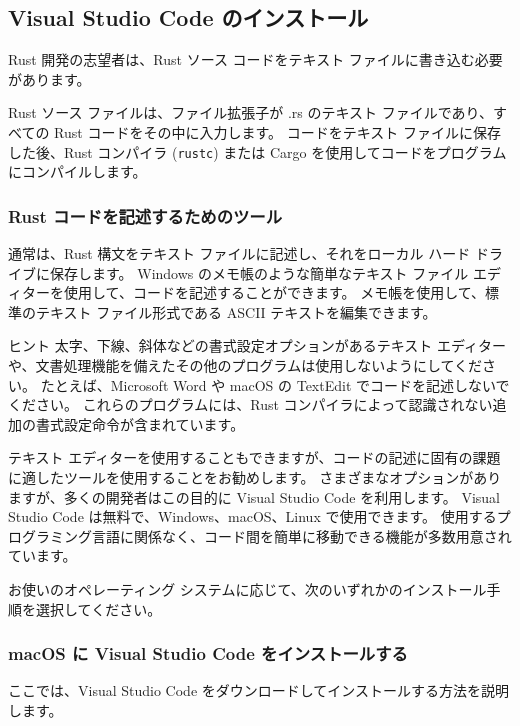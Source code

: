 \subsection{Visual Studio Code のインストール}


Rust 開発の志望者は、Rust ソース コードをテキスト ファイルに書き込む必要があります。

Rust ソース ファイルは、ファイル拡張子が .rs のテキスト ファイルであり、すべての Rust コードをその中に入力します。 コードをテキスト ファイルに保存した後、Rust コンパイラ (\texttt{rustc}) または Cargo を使用してコードをプログラムにコンパイルします。

\subsubsection{Rust コードを記述するためのツール}

通常は、Rust 構文をテキスト ファイルに記述し、それをローカル ハード ドライブに保存します。 Windows のメモ帳のような簡単なテキスト ファイル エディターを使用して、コードを記述することができます。 メモ帳を使用して、標準のテキスト ファイル形式である ASCII テキストを編集できます。

\begin{itembox}[l]{ヒント}
太字、下線、斜体などの書式設定オプションがあるテキスト エディターや、文書処理機能を備えたその他のプログラムは使用しないようにしてください。 たとえば、Microsoft Word や macOS の TextEdit でコードを記述しないでください。 これらのプログラムには、Rust コンパイラによって認識されない追加の書式設定命令が含まれています。
\end{itembox}

テキスト エディターを使用することもできますが、コードの記述に固有の課題に適したツールを使用することをお勧めします。 さまざまなオプションがありますが、多くの開発者はこの目的に Visual Studio Code を利用します。 Visual Studio Code は無料で、Windows、macOS、Linux で使用できます。 使用するプログラミング言語に関係なく、コード間を簡単に移動できる機能が多数用意されています。

お使いのオペレーティング システムに応じて、次のいずれかのインストール手順を選択してください。

\subsubsection{macOS に Visual Studio Code をインストールする}

ここでは、Visual Studio Code をダウンロードしてインストールする方法を説明します。

